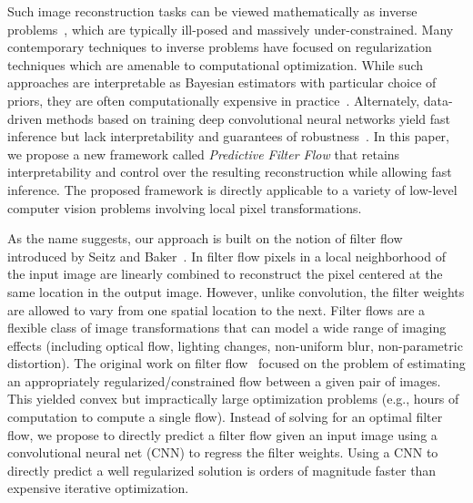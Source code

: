 \documentclass[10pt,twocolumn,letterpaper]{article}
\begin{document}
%
%

Such image reconstruction tasks can be viewed mathematically as inverse
problems~\cite{tarantola2005inverse,kaipio2006statistical}, which are typically
ill-posed and massively under-constrained. Many contemporary techniques to
inverse problems have focused on regularization techniques which are amenable
to computational optimization. While such approaches are interpretable as
Bayesian estimators with particular choice of priors, they are often
computationally expensive in
practice~\cite{fergus2006removing,shan2008high,bahat2017non}.  Alternately,
data-driven methods based on training deep convolutional neural networks yield
fast inference but lack interpretability and guarantees of
robustness~\cite{sun2015learning,zhang2018residual}.  In this paper, we propose
a new framework called \emph{Predictive Filter Flow} that retains
interpretability and control over the resulting reconstruction while allowing
fast inference.  The proposed framework is directly applicable to a variety of
low-level computer vision problems involving local pixel transformations.

As the name suggests, our approach is built on the notion of filter flow
introduced by Seitz and Baker~\cite{seitz2009filter}.  In filter flow pixels in
a local neighborhood of the input image are linearly combined to reconstruct
the pixel centered at the same location in the output image.  However, unlike
convolution, the filter weights are allowed to vary from one spatial location to
the next. Filter flows are a flexible class of image transformations that can
model a wide range of imaging effects (including optical flow, lighting
changes, non-uniform blur, non-parametric distortion). The original work on
filter flow~\cite{seitz2009filter} focused on the problem of estimating an
appropriately regularized/constrained flow between a given pair of images.
This yielded convex but impractically large optimization problems (e.g., hours
of computation to compute a single flow).  Instead of solving for an optimal
filter flow, we propose to directly predict a filter flow given an input image
using a convolutional neural net (CNN) to regress the filter weights.  Using a
CNN to directly predict a well regularized solution is orders of magnitude
faster than expensive iterative optimization.
\end{document}

